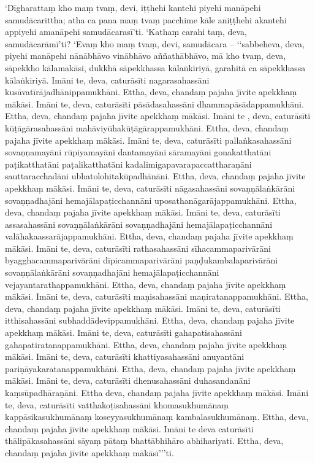 ‘Dīgharattaṃ kho maṃ tvaṃ, devi, iṭṭhehi kantehi piyehi manāpehi samudācarittha; atha ca pana maṃ tvaṃ pacchime kāle aniṭṭhehi akantehi appiyehi amanāpehi samudācarasī’ti. ‘Kathaṃ carahi taṃ, deva, samudācarāmī’ti? ‘Evaṃ kho maṃ tvaṃ, devi, samudācara – ‘‘sabbeheva, deva, piyehi manāpehi nānābhāvo vinābhāvo aññathābhāvo, mā kho tvaṃ, deva, sāpekkho kālamakāsi, dukkhā sāpekkhassa kālaṅkiriyā, garahitā ca sāpekkhassa kālaṅkiriyā. Imāni te, deva, caturāsīti nagarasahassāni kusāvatīrājadhānippamukhāni. Ettha, deva, chandaṃ pajaha jīvite apekkhaṃ mākāsi. Imāni te, deva, caturāsīti pāsādasahassāni dhammapāsādappamukhāni. Ettha, deva, chandaṃ pajaha jīvite apekkhaṃ mākāsi. Imāni te , deva, caturāsīti kūṭāgārasahassāni mahāviyūhakūṭāgārappamukhāni. Ettha, deva, chandaṃ pajaha jīvite apekkhaṃ mākāsi. Imāni te, deva, caturāsīti pallaṅkasahassāni sovaṇṇamayāni rūpiyamayāni dantamayāni sāramayāni gonakatthatāni paṭikatthatāni paṭalikatthatāni kadalimigapavarapaccattharaṇāni sauttaracchadāni ubhatolohitakūpadhānāni. Ettha, deva, chandaṃ pajaha jīvite apekkhaṃ mākāsi. Imāni te, deva, caturāsīti nāgasahassāni sovaṇṇālaṅkārāni sovaṇṇadhajāni hemajālapaṭicchannāni uposathanāgarājappamukhāni. Ettha, deva, chandaṃ pajaha jīvite apekkhaṃ mākāsi. Imāni te, deva, caturāsīti assasahassāni sovaṇṇālaṅkārāni sovaṇṇadhajāni hemajālapaṭicchannāni valāhakaassarājappamukhāni. Ettha, deva, chandaṃ pajaha jīvite apekkhaṃ mākāsi. Imāni te, deva, caturāsīti rathasahassāni sīhacammaparivārāni byagghacammaparivārāni dīpicammaparivārāni paṇḍukambalaparivārāni sovaṇṇālaṅkārāni sovaṇṇadhajāni hemajālapaṭicchannāni vejayantarathappamukhāni. Ettha, deva, chandaṃ pajaha jīvite apekkhaṃ mākāsi. Imāni te, deva, caturāsīti maṇisahassāni maṇiratanappamukhāni. Ettha, deva, chandaṃ pajaha jīvite apekkhaṃ mākāsi. Imāni te, deva, caturāsīti itthisahassāni subhaddādevippamukhāni. Ettha, deva, chandaṃ pajaha jīvite apekkhaṃ mākāsi. Imāni te, deva, caturāsīti gahapatisahassāni gahapatiratanappamukhāni. Ettha, deva, chandaṃ pajaha jīvite apekkhaṃ mākāsi. Imāni te, deva, caturāsīti khattiyasahassāni anuyantāni pariṇāyakaratanappamukhāni. Ettha, deva, chandaṃ pajaha jīvite apekkhaṃ mākāsi. Imāni te, deva, caturāsīti dhenusahassāni duhasandanāni kaṃsūpadhāraṇāni. Ettha deva, chandaṃ pajaha jīvite apekkhaṃ mākāsi. Imāni te, deva, caturāsīti vatthakoṭisahassāni khomasukhumānaṃ kappāsikasukhumānaṃ koseyyasukhumānaṃ kambalasukhumānaṃ. Ettha, deva, chandaṃ pajaha jīvite apekkhaṃ mākāsi. Imāni te deva caturāsīti thālipākasahassāni sāyaṃ pātaṃ bhattābhihāro abhihariyati. Ettha, deva, chandaṃ pajaha jīvite apekkhaṃ mākāsī’’’ti.

